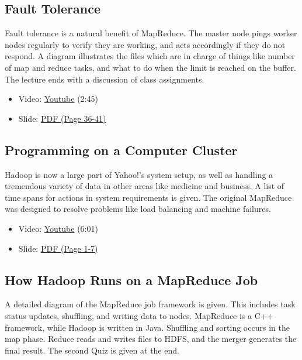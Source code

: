 \subsection{Fault Tolerance}\label{fault-tolerance}

Fault tolerance is a natural benefit of MapReduce. The master node pings
worker nodes regularly to verify they are working, and acts accordingly
if they do not respond. A diagram illustrates the files which are in
charge of things like number of map and reduce tasks, and what to do
when the limit is reached on the buffer. The lecture ends with a
discussion of class assignments.

\begin{itemize}

\item
  Video: \href{https://www.youtube.com/watch?v=a3AlOTmD42k}{Youtube}
  (2:45)
\item
  Slide:
  \href{https://drive.google.com/open?id=0B88HKpainTSfMnpCelpNQUpNdVE}{PDF
  (Page 36-41)}
\end{itemize}

\subsection{Programming on a Computer
Cluster}\label{programming-on-a-computer-cluster}

Hadoop is now a large part of Yahoo!'s system setup, as well as handling
a tremendous variety of data in other areas like medicine and business.
A list of time spans for actions in system requirements is given. The
original MapReduce was designed to resolve problems like load balancing
and machine failures.

\begin{itemize}

\item
  Video: \href{https://www.youtube.com/watch?v=rRR2ALa5CUA}{Youtube}
  (6:01)
\item
  Slide:
  \href{https://drive.google.com/open?id=0B88HKpainTSfd3hkTG4yY2FYUVE}{PDF
  (Page 1-7)}
\end{itemize}

\subsection{How Hadoop Runs on a MapReduce
Job}\label{how-hadoop-runs-on-a-mapreduce-job}

A detailed diagram of the MapReduce job framework is given. This
includes task status updates, shuffling, and writing data to nodes.
MapReduce is a C++ framework, while Hadoop is written in Java. Shuffling
and sorting occurs in the map phase. Reduce reads and writes files to
HDFS, and the merger generates the final result. The second Quiz is
given at the end.

